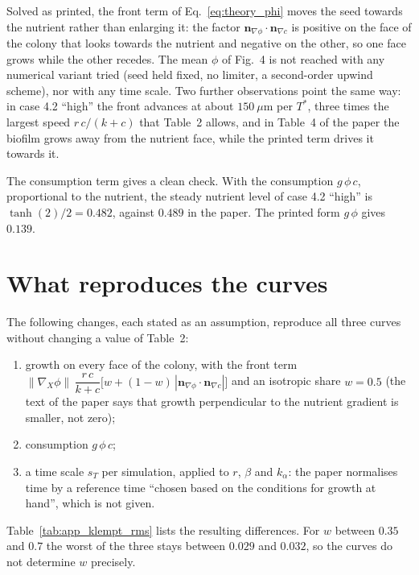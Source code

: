 Solved as printed, the front term of Eq.~\eqref{eq:theory_phi} moves the seed
towards the nutrient rather than enlarging it: the factor
$\mathbf n_{\nabla\phi}\cdot\mathbf n_{\nabla c}$ is positive on the face of
the colony that looks towards the nutrient and negative on the other, so one
face grows while the other recedes. The mean $\phi$ of Fig.~4 is not reached
with any numerical variant tried (seed held fixed, no limiter, a second-order
upwind scheme), nor with any time scale. Two further observations point the
same way: in case 4.2 ``high'' the front advances at about $150~\mu$m per
$T^*$, three times the largest speed $r\,c/(k+c)$ that Table~2 allows, and in
Table~4 of the paper the biofilm grows away from the nutrient face, while the
printed term drives it towards it.

The consumption term gives a clean check. With the consumption
$g\,\phi\,c$, proportional to the nutrient, the steady nutrient level of
case 4.2 ``high'' is $\tanh(2)/2=0.482$, against $0.489$ in the paper. The
printed form $g\,\phi$ gives $0.139$.

\section{What reproduces the curves}

The following changes, each stated as an assumption, reproduce all three
curves without changing a value of Table~2:
\begin{enumerate}
  \item growth on every face of the colony, with the front term
        $\|\nabla_X\phi\|\,\dfrac{r\,c}{k+c}\bigl[w+(1-w)\,|\mathbf n_{\nabla\phi}\cdot\mathbf n_{\nabla c}|\bigr]$
        and an isotropic share $w=0.5$ (the text of the paper says that growth
        perpendicular to the nutrient gradient is smaller, not zero);
  \item consumption $g\,\phi\,c$;
  \item a time scale $s_T$ per simulation, applied to $r$, $\beta$ and
        $k_\alpha$: the paper normalises time by a reference time ``chosen
        based on the conditions for growth at hand'', which is not given.
\end{enumerate}
Table~\ref{tab:app_klempt_rms} lists the resulting differences. For $w$
between $0.35$ and $0.7$ the worst of the three stays between $0.029$ and
$0.032$, so the curves do not determine $w$ precisely.

